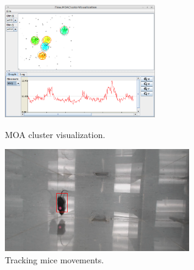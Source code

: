\documentclass[wcp]{jmlr}
\begin{document}
\begin{figure}[htb]
  \begin{minipage}[b]{0.5\linewidth}
  \centering
  \includegraphics[width=6.5cm]{images/cluster_visualization.png}
  \caption{MOA cluster visualization.}
  \label{cluster_visualization}
  \end{minipage}%
  \begin{minipage}[b]{0.5\linewidth}
  \centering
  \includegraphics[width=8.0cm]{images/object_tracking_mouse.png}
  \caption{Tracking mice movements.}
  \label{object_tracking_mouse}
  \end{minipage}
\end{figure}
\end{document}
